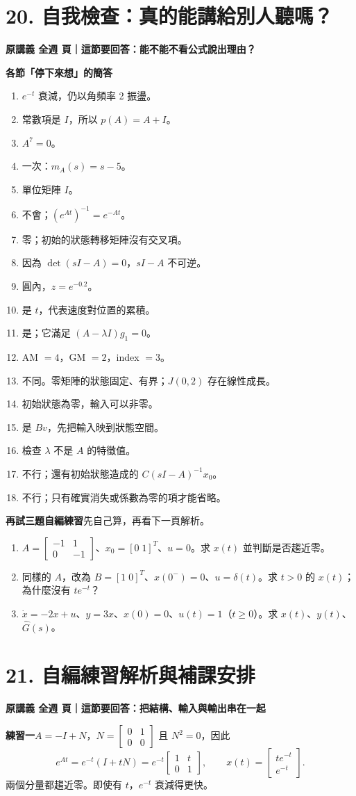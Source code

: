 \documentclass[12pt,a4paper]{article}
\newcommand{\topic}[3]{\clearpage\section*{#1}\textcolor{accent}{\textbf{原講義 #2 頁｜這節要回答：#3}}\par}
\begin{document}
\topic{20. 自我檢查：真的能講給別人聽嗎？}{全週}{能不能不看公式說出理由？}
\textbf{各節「停下來想」的簡答}
\begin{enumerate}
\item $e^{-t}$ 衰減，仍以角頻率 2 振盪。
\item 常數項是 $I$，所以 $p(A)=A+I$。
\item $A^7=0$。
\item 一次：$m_A(s)=s-5$。
\item 單位矩陣 $I$。
\item 不會；$(e^{At})^{-1}=e^{-At}$。
\item 零；初始的狀態轉移矩陣沒有交叉項。
\item 因為 $\det(sI-A)=0$，$sI-A$ 不可逆。
\item 圓內，$z=e^{-0.2}$。
\item 是 $t$，代表速度對位置的累積。
\item 是；它滿足 $(A-\lambda I)g_1=0$。
\item AM $=4$，GM $=2$，index $=3$。
\item 不同。零矩陣的狀態固定、有界；$J(0,2)$ 存在線性成長。
\item 初始狀態為零，輸入可以非零。
\item 是 $Bv$，先把輸入映到狀態空間。
\item 檢查 $\lambda$ 不是 $A$ 的特徵值。
\item 不行；還有初始狀態造成的 $C(sI-A)^{-1}x_0$。
\item 不行；只有確實消失或係數為零的項才能省略。
\end{enumerate}
\textbf{再試三題自編練習}\quad 先自己算，再看下一頁解析。
\begin{enumerate}
\item $A=\begin{bmatrix}-1&1\\0&-1\end{bmatrix}$、$x_0=[0\;1]^T$、$u=0$。求 $x(t)$ 並判斷是否趨近零。
\item 同樣的 $A$，改為 $B=[1\;0]^T$、$x(0^-)=0$、$u=\delta(t)$。求 $t>0$ 的 $x(t)$；為什麼沒有 $te^{-t}$？
\item $\dot x=-2x+u$、$y=3x$、$x(0)=0$、$u(t)=1$（$t\ge0$）。求 $x(t)$、$y(t)$、$\widehat G(s)$。
\end{enumerate}

\topic{21. 自編練習解析與補課安排}{全週}{把結構、輸入與輸出串在一起}
\textbf{練習一}\quad $A=-I+N$，$N=\begin{bmatrix}0&1\\0&0\end{bmatrix}$ 且 $N^2=0$，因此
\[
 e^{At}=e^{-t}(I+tN)=e^{-t}\begin{bmatrix}1&t\\0&1\end{bmatrix},\qquad
 x(t)=\begin{bmatrix}te^{-t}\\e^{-t}\end{bmatrix}.
\]
兩個分量都趨近零。即使有 $t$，$e^{-t}$ 衰減得更快。
\end{document}
